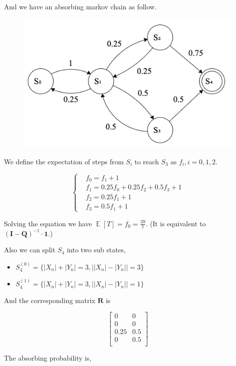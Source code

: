\documentclass{article}
\DeclareMathOperator{\E}{\mathbb{E}}
\begin{document}
And we have an absorbing markov chain as follow.
\begin{figure}[!htbp]
    \centering
    \includegraphics[width=0.5\linewidth]{fsm-2.png}
\end{figure}  

We define the expectation of steps from $S_i$ to reach $S_3$ as $f_i,i=0,1,2$.

\begin{equation}
    \left\{
        \begin{aligned}
            &f_0 = f_1 +1 \\
            &f_1 = 0.25f_0+0.25 f_2+0.5f_3+ 1 \\ 
            &f_2 = 0.25 f_1 + 1 \\
            & f_3 = 0.5f_1+1
        \end{aligned}
    \right.
\end{equation}

Solving the equation we have $\E[T] = f_0 = \frac{39}{7}$. (It is equivalent to $(\boldsymbol{I}-\boldsymbol{Q})^{-1}\cdot \boldsymbol{1}$.)

Also we can split $S_4$ into two sub states,
\begin{itemize}
    \item $S_4^{(0)} = \{|X_n|+|Y_n| = 3, \big| |X_n|-|Y_n|\big|=3\}$
    \item $S_4^{(1)} = \{|X_n|+|Y_n| = 3, \big| |X_n|-|Y_n|\big|=1 \}$
\end{itemize}

And the corresponding matrix $\boldsymbol{R}$ is

\begin{equation}
    \begin{bmatrix}
        0 & 0 \\
        0 & 0\\
        0.25 & 0.5 \\
        0 & 0.5 \\
    \end{bmatrix}
\end{equation}

The absorbing probability is, 
\end{document}
